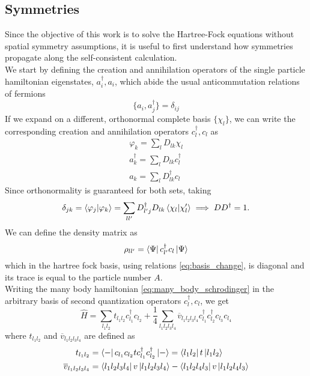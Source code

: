 \subsection{Symmetries}
Since the objective of this work is to solve the Hartree-Fock equations without spatial symmetry assumptions, it is useful to first understand how symmetries propagate along the self-consistent calculation.
\\We start by defining the creation and annihilation operators of the single particle hamiltonian eigenstates, $a_i^\dagger, a_i$, which abide the usual anticommutation relations of fermions
\begin{equation}
    \label{eq:fermion_anticommutations}
    \{a_i, a_j^\dagger\} = \delta_{ij}
\end{equation}
If we expand on a different, orthonormal complete basis $\{\chi_l\}$, we can write the corresponding creation and annihilation operators $c_l^\dagger, c_l$ as
\begin{align}
    \label{eq:basis_change}
    \varphi_k = \sum_l D_{lk} \chi_l\\
    a_k^\dagger = \sum_l D_{lk} c_l^\dagger\\
    a_k = \sum_l D_{lk}^\dagger c_l
\end{align}
Since orthonormality is guaranteed for both sets, taking 
\begin{equation}
    \delta_{jk} = \bra{\varphi_j}\ket{\varphi_k} = \sum_{ll'} D_{l'j}^\dagger D_{lk}\bra{\chi_l}\ket{\chi_l'}\implies DD^\dagger = 1.
\end{equation}
We can define the density matrix as
\begin{equation}
    \label{eq:density_op}
    \rho_{ll'} = \bra{\Psi}c_{l'}^\dagger c_l\ket{\Psi}
\end{equation}
which in the hartree fock basis, using relations \eqref{eq:basis_change}, is diagonal and its trace is equal to the particle number $A$.
\\Writing the many body hamiltonian \eqref{eq:many_body_schrodinger} in the arbitrary basis of second quantization operators $c_l^\dagger, c_l$, we get
\begin{equation}
    \label{eq:mb_hamiltonian_sq}
    \hat H = \sum_{l_1 l_2}t_{l_1l_2} c_{l_1}^\dagger c_{l_2} + \frac 1 4 \sum_{l_1 l_2 l_3 l_4}\overline{v}_{l_1l_2l_3l_4} c_{l_1}^\dagger c_{l_2}^\dagger c_{l_3} c_{l_4}
\end{equation}
where $t_{l_1l_2}$ and $\overline{v}_{l_1 l_2 l_3 l_4}$ are defined as 
\begin{align}
    \label{eq:t_op}
    t_{l_1l_2} &= \bra{-}c_{l_1}c_{l_2} t c_{l_1}^\dagger c_{l_2}^\dagger \ket{-} = \bra{l_1 l_2}t\ket{l_1 l_2}
    \\ \overline{v}_{l_1 l_2 l_3 l_4} &= \bra{l_1 l_2 l_3 l_4} v \ket{l_1 l_2 l_3 l_4} - \bra{l_1 l_2 l_4 l_3} v \ket{l_1 l_2 l_4 l_3}
\end{align}
